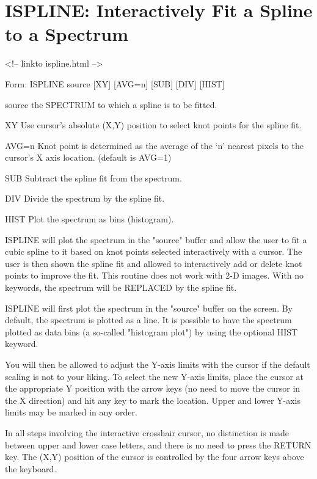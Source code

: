 \section{ISPLINE: Interactively Fit a Spline to a Spectrum}
\begin{rawhtml}
<!-- linkto ispline.html -->
\end{rawhtml}
\begin{command} 
  \item[Form: ISPLINE source {[XY]} {[AVG=n]} {[SUB]} {[DIV]} {[HIST]}\hfill]{}
  \item[source]{the SPECTRUM to which a spline is to be fitted.}
  \item[XY]{Use cursor's absolute (X,Y) position to select
       knot points for the spline fit.}
  \item[AVG=n]{Knot point is determined as the average of the
       `n' nearest pixels to the cursor's X axis location. (default is AVG=1)}
  \item[SUB]{Subtract the spline fit from the spectrum.}
  \item[DIV]{Divide the spectrum by the spline fit.}
  \item[HIST]{Plot the spectrum as bins (histogram).}
\end{command} 
 
ISPLINE will plot the spectrum in the "source" buffer and allow the user to
fit a cubic spline to it based on knot points selected interactively with a
cursor.  The user is then shown the spline fit and allowed to interactively
add or delete knot points to improve the fit.  This routine does not work
with 2-D images.  With no keywords, the spectrum will be REPLACED by the
spline fit.

ISPLINE will first plot the spectrum in the "source" buffer on the screen.
By default, the spectrum is plotted as a line.  It is possible to have the
spectrum plotted as data bins (a so-called "histogram plot") by using the
optional HIST keyword.
 
You will then be allowed to adjust the Y-axis limits with the cursor if the
default scaling is not to your liking. To select the new Y-axis limits,
place the cursor at the appropriate Y position with the arrow keys (no need
to move the cursor in the X direction) and hit any key to mark the
location.  Upper and lower Y-axis limits may be marked in any order.
 
In all steps involving the interactive crosshair cursor, no distinction is
made between upper and lower case letters, and there is no need to press
the RETURN key.  The (X,Y) position of the cursor is controlled by the four
arrow keys above the keyboard.

